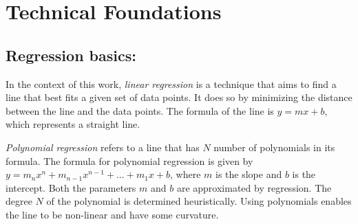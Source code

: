 \section{Technical Foundations}

\subsection{Regression basics:}

 In the context of this work, \textit{linear regression} is a technique that aims to find a line that best fits a given set of data points. It does so by minimizing the distance between the line and the data points. The formula of the line is $y = mx + b$, which represents a straight line.

\textit{Polynomial regression} refers to a line that has $N$ number of polynomials in its formula. The formula for polynomial regression is given by $y = m_{n}x^{n} + m_{n-1}x^{n-1} + \ldots + m_{1}x + b$, where $m$ is the slope and $b$ is the intercept. Both the parameters $m$ and $b$ are approximated by regression. The degree $N$ of the polynomial is determined heuristically. Using polynomials enables the line to be non-linear and have some curvature.
